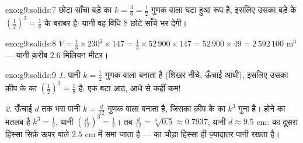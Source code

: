 \begin{solution}{exo:g9:solids:7}
छोटा साँचा बड़े का $k = \frac36 = \frac12$ गुणक वाला घटा हुआ रूप है,
इसलिए उसका  बड़े के $\left(\frac12\right)^3 = \frac18$ के बराबर
है: यानी वह विधि $8$ छोटे साँचे भर देगी।
\end{solution}

\begin{solution}{exo:g9:solids:8}
$V = \frac13 \times 230^2 \times 147 = \frac13 \times 52\,900 \times 147
= 52\,900 \times 49 = 2\,592\,100$ m$^3$ --- यानी क़रीब $2.6$ मिलियन
 मीटर।
\end{solution}

\begin{solution}{exo:g9:solids:9}
\emph{1.} पानी $k = \frac12$ गुणक वाला  बनाता है (शिखर नीचे,
ऊँचाई आधी), इसलिए उसका  क़ीप के  का
$\left(\frac12\right)^3 = \frac18$ है: एक बटा आठ, आधे से कहीं कम!

\emph{2.} ऊँचाई $d$ तक भरा पानी $k = \frac{d}{12}$ गुणक वाला 
बनाता है, जिसका  क़ीप के  का $k^3$ गुना है।   होने का
मतलब है $k^3 = \frac12$, यानी
$\left(\frac{d}{12}\right)^3 = \frac12$। तब
$\frac{d}{12} = \sqrt[3]{0.5} \approx 0.7937$, यानी
$d \approx 9.5$ cm:  का दूसरा  हिस्सा सिर्फ़ ऊपर वाले
$2.5$ cm में समा जाता है ---  का चौड़ा हिस्सा ही ज़्यादातर पानी
रखता है।
\end{solution}

